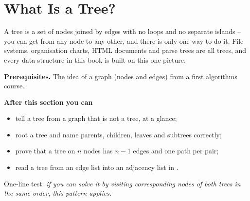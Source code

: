 \section{What Is a Tree?}\label{sec:c01-what-is-tree}

\begin{topicintro}
A tree is a set of nodes joined by edges with no loops and no separate islands --
you can get from any node to any other, and there is only one way to do it. File
systems, organisation charts, HTML documents and parse trees are all trees, and every
data structure in this book is built on this one picture.

\textbf{Prerequisites.} The idea of a graph (nodes and edges) from a first
algorithms course.

\textbf{After this section you can}
\begin{itemize}[nosep]
  \item tell a tree from a graph that is not a tree, at a glance;
  \item root a tree and name parents, children, leaves and subtrees correctly;
  \item prove that a tree on $n$ nodes has $n-1$ edges and one path per pair;
  \item read a tree from an edge list into an adjacency list in \cpp.
\end{itemize}
\end{topicintro}

\begin{recognitionbox}
One-line test: \emph{if you can solve it by visiting corresponding nodes of both trees
in the same order, this pattern applies.}
\end{recognitionbox}

